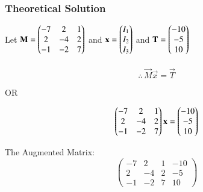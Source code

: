 \documentclass{beamer}
\begin{document}
\begin{frame}[fragile]
    \frametitle{Theoretical Solution}
 Let $\mathbf{M} = \begin{pmatrix}-7 & 2 & 1 \\ 2 & -4 & 2 \\ -1 & -2 & 7\end{pmatrix}$ and $\mathbf{x} = \begin{pmatrix}I_1 \\ I_2 \\ I_3\end{pmatrix}$ and $\mathbf{T} = \begin{pmatrix}-10 \\ -5 \\ 10\end{pmatrix}$\\\\

\begin{equation}
    \therefore \, \vec{M}\vec{x}=\vec{T}
\end{equation}

\begin{center}
OR    
\end{center}

\begin{equation}
    \begin{pmatrix}-7 & 2 & 1 \\ 2 & -4 & 2 \\ -1 & -2 & 7\end{pmatrix}\mathbf{x} = \begin{pmatrix}-10 \\ -5 \\ 10\end{pmatrix}
\end{equation}

The Augmented Matrix:
\begin{equation}
\left(
\begin{array}{ccc|c}
     -7 & 2 & 1 & -10  \\
     2 & -4 & 2 & -5 \\
     -1 & -2 & 7 & 10 
\end{array}
\right)
\end{equation}
\end{frame}
\end{document}
